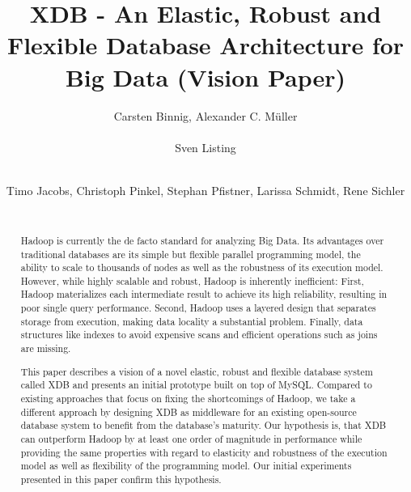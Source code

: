 \documentclass{sig-alternate}
\begin{document}
\title{XDB - An Elastic, Robust and Flexible Database Architecture for Big Data (Vision Paper)}


\author{
\alignauthor
Carsten Binnig, Alexander C. M\"uller\\
       \\
\alignauthor
Sven Listing\\
       \\
\and
\alignauthor
Timo Jacobs, Christoph Pinkel, Stephan Pfistner, Larissa Schmidt, Rene Sichler\\
      \\
\vspace{-2ex}
}

\maketitle
\begin{abstract}

Hadoop is currently the de facto standard for analyzing Big Data. Its advantages over traditional databases are its simple but flexible parallel programming model, the ability to scale to thousands of nodes as well as the robustness of its execution model. However, while highly scalable and robust, Hadoop is inherently inefficient: First, Hadoop materializes each intermediate result to achieve its high reliability, resulting in poor single query performance. Second, Hadoop uses a layered design that separates storage from execution, making data locality a substantial problem. Finally, data structures like indexes to avoid expensive scans and efficient operations such as joins are missing. 

This paper describes a vision of a novel elastic, robust and flexible database system called XDB and presents an initial prototype built on top of MySQL. Compared to existing approaches that focus on fixing the shortcomings of Hadoop, we take a different approach by designing XDB as middleware for an existing open-source database system to benefit from the database's maturity.
Our hypothesis is, that XDB can outperform Hadoop by at least one order of magnitude in performance while providing the same properties with regard to elasticity and robustness of the execution model as well as flexibility of the programming model. Our initial experiments presented in this paper confirm this hypothesis.

\end{abstract}
\end{document}
